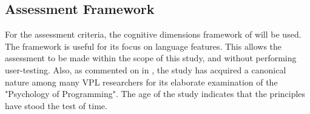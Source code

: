 





\subsection{Assessment Framework}
For the assessment criteria, the cognitive dimensions framework of \cite[]{green_usability_1996} will be used. 
The framework is useful for its focus on language features. 
This allows the assessment to be made within the scope of this study, and without performing user-testing.
Also, as commented on in , the study has acquired a canonical nature among many VPL researchers for its elaborate examination of the "Psychology of Programming".
The age of the study indicates that the principles have stood the test of time. 

